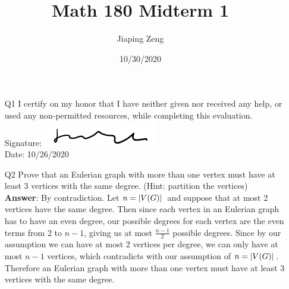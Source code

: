 \documentclass{article}
\title{Math 180 Midterm 1}
\author{Jiaping Zeng}
\date{10/30/2020}
\begin{document}

\newpage
\begin{itemize}
    \item [Q1] I certify on my honor that I have neither given nor received any help, or used any non-permitted resources, while completing this evaluation.\\
          Signature:\includegraphics[width=2in]{signature.png}\\
          Date: 10/26/2020
\end{itemize}


\newpage
\begin{itemize}
    \item [Q2] Prove that an Eulerian graph with more than one vertex must have at least 3 vertices with the same degree. (Hint: partition the vertices)\\
          \textbf{Answer}: By contradiction. Let $n=\abs*{V(G)}$ and suppose that at most 2 vertices have the same degree. Then since each vertex in an Eulerian graph has to have an even degree, our possible degrees for each vertex are the even terms from 2 to $n-1$, giving us at most $\frac{n-1}{2}$ possible degrees. Since by our assumption we can have at most 2 vertices per degree, we can only have at most $n-1$ vertices, which contradicts with our assumption of $n=\abs*{V(G)}$. Therefore an Eulerian graph with more than one vertex must have at least 3 vertices with the same degree.
\end{itemize}
\end{document}
